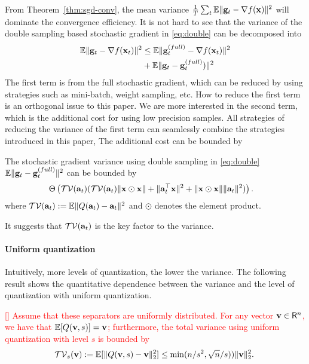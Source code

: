 From Theorem~\ref{thm:sgd-conv}, the mean variance ${1\over T}\sum_{t}\mathbb{E}\|{\bf g}_t - \nabla f({\bf x})\|^2$ will dominate the convergence efficiency. It is not hard to see that the variance of the double sampling based stochastic gradient in \eqref{eq:double} can be decomposed into
\vspace{-0.5em}
\begin{align*}
\mathbb{E}\|{\bf g}_t - \nabla f({\bf x}_t)\|^2 & \leq \mathbb{E} \|{\bf g}_t^{(full)}- \nabla f({\bf x}_t)\|^2 
\\
&+ \mathbb{E} \|{\bf g}_t - {\bf g}_t^{(full)})\|^2
\end{align*}
The first term is from the full stochastic gradient, which can be reduced by using strategies such as mini-batch, weight sampling, etc. How to reduce the first term is an orthogonal issue to this paper. We are more interested in the second term, which is the additional cost for using low precision samples. All strategies of reducing the variance of the first term can seamlessly combine the strategies introduced in this paper, The additional cost can be bounded by
\begin{lemma} 
The stochastic gradient variance using double sampling in \eqref{eq:double} $\mathbb{E}\|{\bf g}_t - {\bf g}_t^{(full)}\|^2$ can be bounded by
\begin{align*}
&\Theta\left(\mathcal{TV}({\bf a}_t) (\mathcal{TV}({\bf a}_t)\|{\bf x}\odot {\bf x}\| + \|{\bf a}_t^\top {\bf x}\|^2 + \|{\bf x}\odot {\bf x}\|\|{\bf a}_t\|^2)\right).
\end{align*}
where $\mathcal{TV}({\bf a}_t) := \mathbb{E}\|Q({\bf a}_t) - {\bf a}_t\|^2$ and $\odot$ denotes the element product.
\end{lemma}
It suggests that $\mathcal{TV}({\bf a}_t)$ is the key factor to the variance. 

\vspace{-0.5em}
\paragraph{Uniform quantization} Intuitively, more levels of quantization, the lower the variance. The following result shows the quantitative dependence between the variance and the level of quantization with uniform quantization. 
\begin{lemma}
\textcolor{red}{
\label{lem:quant-facts} [\cite{Alistarh:2016:ArXiv}]
Assume that these separators are uniformly distributed. For any vector $\mathbf{v} \in \mathsf{R}^n$, we have that $\mathbb{E} [Q (\mathbf{v},s)] = \mathbf{v}$; furthermore, the total variance using uniform quantization with level $s$ is bounded by
\[
\mathcal{TV}_s({\bf v}):=\mathbb{E} [\| Q (\mathbf{v},s) - {\bf v}\|_2^2] \leq \min( n/s^2,\sqrt{n}/s)) \| \mathbf{v} \|_2^2. \;
\]}
\end{lemma} 

